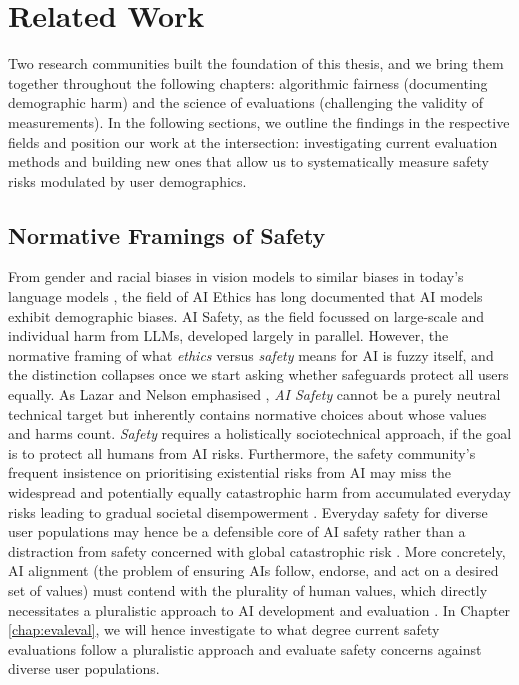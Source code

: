 


\chapter{Related Work}


Two research communities built the foundation of this thesis, and we bring them together throughout the following chapters: algorithmic fairness (documenting demographic harm) and the science of evaluations (challenging the validity of measurements). In the following sections, we outline the findings in the respective fields and position our work at the intersection: investigating current evaluation methods and building new ones that allow us to systematically measure safety risks modulated by user demographics.



\section{Normative Framings of Safety}


From gender and racial biases in vision models \cite{Buolamwini2018GenderSI} to similar biases in today's language models \cite{parrish-etal-2022-bbq}, the field of AI Ethics has long documented that AI models exhibit demographic biases. AI Safety, as the field focussed on large-scale and individual harm from LLMs, developed largely in parallel. However, the normative framing of what \textit{ethics} versus \textit{safety} means for AI is fuzzy itself, and the distinction collapses once we start asking whether safeguards protect all users equally. As Lazar and Nelson emphasised \cite{lazar2023ai-a8d}, \textit{AI Safety} cannot be a purely neutral technical target but inherently contains normative choices about whose values and harms count. \textit{Safety} requires a holistically sociotechnical approach, if the goal is to protect all humans from AI risks.
 Furthermore, the safety community's frequent insistence on prioritising existential risks from AI may miss the widespread and potentially equally catastrophic harm from accumulated everyday risks leading to gradual societal disempowerment \cite{kulveit2025gradualdisempowermentsystemicexistential}. Everyday safety for diverse user populations may hence be a defensible core of AI safety rather than a distraction from safety concerned with global catastrophic risk \cite{gyevnar2025ai-cae}.
 More concretely, AI alignment (the problem of ensuring AIs follow, endorse, and act on a desired set of values) must contend with the plurality of human values, which directly necessitates a pluralistic approach to AI development and evaluation \cite{sorensen2024roadmap}. In Chapter \ref{chap:evaleval}, we will hence investigate to what degree current safety evaluations follow a pluralistic approach and evaluate safety concerns against diverse user populations.


